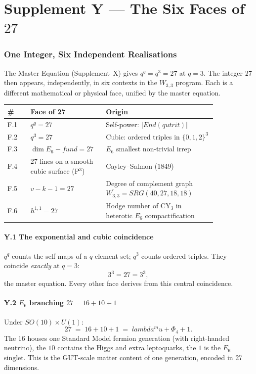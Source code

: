 \documentclass[12pt,a4paper]{article}
\def\mathrm#1{#1}%
\def\mathbf#1{#1}%
\def\text#1{#1}%
\def\lambda{lambda}%
\def\mu{mu}%
\def\Phi#1{Phi#1}%
\theoremstyle{definition}
\newcommand{\SRG}{\mathrm{SRG}}
\newcommand{\SO}{\mathrm{SO}}
\begin{document}
\part*{Supplement Y --- The Six Faces of $27$}

\section*{One Integer, Six Independent Realisations}

The Master Equation (Supplement~X) gives $q^q = q^3 = 27$ at $q=3$.
The integer 27 then appears, independently, in six contexts in the
$W_{3,3}$ program. Each is a different mathematical or physical face,
unified by the master equation.

\begin{center}
\renewcommand{\arraystretch}{1.4}
\small
\begin{tabular}{@{}>{\raggedleft\arraybackslash}p{0.10\linewidth}>{\raggedright\arraybackslash}p{0.26\linewidth}>{\raggedright\arraybackslash}p{0.48\linewidth}@{}}
\toprule
\# & Face of 27 & Origin \\
\midrule
F.1 & $q^q = 27$ & Self-power: $|\mathrm{End}(\text{qutrit})|$ \\
F.2 & $q^3 = 27$ & Cubic: ordered triples in $\{0,1,2\}^3$ \\
F.3 & $\dim E_6\text{-fund} = 27$ & $E_6$ smallest non-trivial irrep \\
F.4 & $27$ lines on a smooth cubic surface (P$^3$) & Cayley--Salmon (1849) \\
F.5 & $v - k - 1 = 27$ & Degree of complement graph $\overline{W_{3,3}} = \SRG(40,27,18,18)$ \\
F.6 & $h^{1,1} = 27$ & Hodge number of CY$_3$ in heterotic $E_6$ compactification \\
\bottomrule
\end{tabular}
\end{center}

\subsection*{Y.1 \quad The exponential and cubic coincidence}
$q^q$ counts the self-maps of a $q$-element set; $q^3$ counts ordered
triples. They coincide \emph{exactly} at $q=3$:
\[
3^3 = 27 = 3^3,
\]
the master equation. Every other face derives from this central
coincidence.

\subsection*{Y.2 \quad $E_6$ branching $27 = 16 + 10 + 1$}
Under $\SO(10)\times\mathrm{U}(1)$:
\[
27 \;=\; \mathbf{16}+\mathbf{10}+\mathbf{1} \;=\; \lambda^\mu + \Phi_4 + 1.
\]
The $\mathbf{16}$ houses one Standard Model fermion generation (with
right-handed neutrino), the $\mathbf{10}$ contains the Higgs and extra
leptoquarks, the $\mathbf{1}$ is the $E_6$ singlet. This is the
GUT-scale matter content of one generation, encoded in 27 dimensions.
\end{document}
